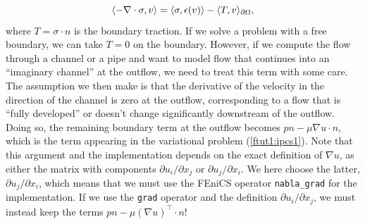 \documentclass[graybox,envcountchap,sectrefs,final]{svmonodo}
\begin{document}
\[
  \inner{-\nabla\cdot\sigma}{v}
  = \inner{\sigma}{\epsilon(v)}
  - \inner{T}{v}_{\partial\Omega},
\]
where $T = \sigma\cdot n$ is the boundary traction. If we solve a
problem with a free boundary, we can take $T = 0$ on the
boundary. However, if we compute the flow through a channel or a pipe
and want to model flow that continues into an ``imaginary channel'' at
the outflow, we need to treat this term with some care. The assumption
we then make is that the derivative of the velocity in the direction
of the channel is zero at the outflow, corresponding to a flow that is
``fully developed'' or doesn't change significantly downstream of the
outflow. Doing so, the remaining boundary term at the outflow becomes
$pn - \mu\nabla u \cdot n$, which is the term appearing in the
variational problem (\ref{ftut1:ipcs1}). Note that this argument and
the implementation depends on the exact definition of $\nabla u$, as
either the matrix with components $\partial u_i / \partial x_j$ or
$\partial u_j / \partial x_i$. We here choose the latter, $\partial
u_j / \partial x_i$, which means that we must use the FEniCS operator
\Verb!nabla_grad! for the implementation. If we use the \texttt{grad} operator and
the definition $\partial u_i / \partial x_j$, we must instead keep the
terms $pn - \mu(\nabla u)^{\top} \cdot n$!

\end{document}
